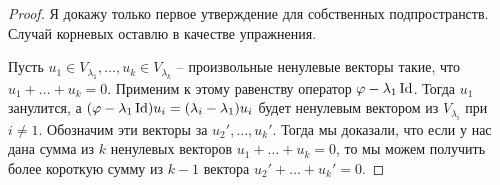 \begin{proof}
Я докажу только первое утверждение для собственных подпространств. Случай корневых оставлю в качестве упражнения.

Пусть $u_1\in V_{\lambda_1},\ldots,u_k\in V_{\lambda_k}$ -- произвольные ненулевые векторы такие, что $u_1 + \ldots + u_k = 0$. Применим к этому равенству оператор $\varphi - \lambda_1\operatorname{Id}$. Тогда $u_1$ занулится, а $(\varphi - \lambda_1\operatorname{Id})u_i = (\lambda_i - \lambda_1)u_i$ будет ненулевым вектором из $V_{\lambda_i}$ при $i \neq 1$. Обозначим эти векторы за $u_2',\ldots,u_k'$. Тогда мы доказали, что если у нас дана сумма из $k$ ненулевых векторов $u_1+\ldots+u_k = 0$, то мы можем получить более короткую сумму из $k - 1$ вектора $u_2'+\ldots+u_k' = 0$.

%
%
%
\end{proof}

